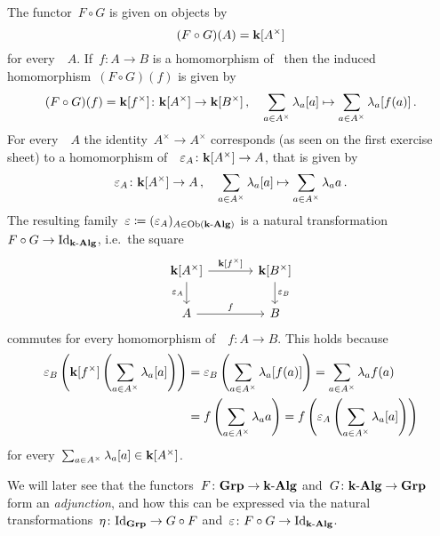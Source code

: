 \begin{example}
  The functor~$F \circ G$ is given on objects by
  \[
      (F \circ G)(A)
    = \mathbf{k}[A^\times]
  \]
  for every~{\kalg}~$A$.
  If~$f \colon A \to B$ is a homomorphism of~{\kalgs} then the induced~{\kalg} homomorphism~$(F \circ G)(f)$ is given by
  \[
            (F \circ G)(f)
    =       \mathbf{k}[f^\times]
    \colon  \mathbf{k}[A^\times]
    \to     \mathbf{k}[B^\times] \,,
    \quad   \sum_{a \in A^\times} \lambda_a [a]
    \mapsto \sum_{a \in A^\times} \lambda_a [f(a)] \,.
  \]
  For every~{\kalg}~$A$ the identity~$A^\times \to A^\times$ corresponds (as seen on the first exercise sheet) to a homomorphism of~{\kalg}~$\varepsilon_A \colon \mathbf{k}[A^\times] \to A$, that is given by
  \[
            \varepsilon_A
    \colon  \mathbf{k}[A^\times]
    \to     A \,,
    \quad   \sum_{a \in A^\times} \lambda_a [a]
    \mapsto \sum_{a \in A^\times} \lambda_a a \,.
  \]
  The resulting family~$\varepsilon \coloneqq (\varepsilon_A)_{A \in \operatorname{Ob}(\text{$\mathbf{k}$-$\mathbf{Alg}$})}$ is a natural transformation~$F \circ G \to \mathrm{Id}_{\text{$\mathbf{k}$-$\mathbf{Alg}$}}$, i.e.\ the square
  \[
    \begin{tikzcd}[column sep = large]
        \kf[A^\times]
        \arrow{r}[above]{\kf[f^\times]}
        \arrow{d}[left]{\varepsilon_A}
      & \kf[B^\times]
        \arrow{d}[right]{\varepsilon_B}
      \\
        A
        \arrow{r}[above]{f}
      & B
    \end{tikzcd}
  \]
  commutes for every homomorphism of~{\kalgs}~$f \colon A \to B$.
  This holds because
  \begin{align*}
        \varepsilon_B\left( \mathbf{k}[f^\times]\left( \sum_{a \in A^\times} \lambda_a [a] \right) \right)
    &=  \varepsilon_B\left( \sum_{a \in A^\times} \lambda_a [f(a)] \right)
     =  \sum_{a \in A^\times} \lambda_a f(a)  \\
    &=  f\left( \sum_{a \in A^\times} \lambda_a a \right)
     =  f\left( \varepsilon_A\left( \sum_{a \in A^\times} \lambda_a [a] \right) \right)
  \end{align*}
  for every~$\sum_{a \in A^\times} \lambda_a [a] \in \mathbf{k}[A^\times]$.
  
  We will later see that the functors~$F \colon \mathbf{Grp} \to \text{$\mathbf{k}$-$\mathbf{Alg}$}$ and~$G \colon \text{$\mathbf{k}$-$\mathbf{Alg}$} \to \mathbf{Grp}$ form an \emph{adjunction}, and how this can be expressed via the natural transformations~$\eta \colon \mathrm{Id}_{\mathbf{Grp}} \to G \circ F$ and~$\varepsilon \colon F \circ G \to \mathrm{Id}_{\text{$\mathbf{k}$-$\mathbf{Alg}$}}$.
\end{example}










